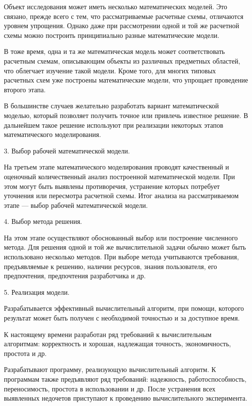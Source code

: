 Объект исследования может иметь несколько математических моделей. Это связано, прежде всего с тем, что рассматриваемые  расчетные схемы, отличаются уровнем упрощения. Однако даже при рассмотрении одной и той же расчетной схемы можно построить принципиально разные математические модели.


В тоже время, одна и та же математическая модель может соответствовать расчетным схемам, описывающим объекты из различных предметных областей, что облегчает изучение такой модели. Кроме того, для многих типовых расчетных схем уже построены математические модели, что упрощает проведение второго этапа.


В большинстве случаев желательно разработать вариант математической моделью, который позволяет получить точное или привлечь известное решение. В дальнейшем такое решение используют при реализации некоторых этапов математического моделирования.


3. Выбор рабочей математической модели.


На третьем этапе математического моделирования проводят качественный и оценочный количественный анализ построенной математической модели. При этом могут быть выявлены противоречия, устранение которых потребует уточнения или пересмотра расчетной схемы. Итог анализа на рассматриваемом этапе — выбор рабочей математической модели.


4. Выбор метода решения.


На этом этапе осуществляют обоснованный выбор или построение численного метода. Для решения одной и той же вычислительной задачи обычно может быть использовано несколько методов.  При выборе метода учитываются требования, предъявляемые к решению,  наличии ресурсов, знания пользователя, его предпочтения, предпочтения разработчика и др.


5. Реализация модели.


Разрабатывается эффективный вычислительный алгоритм, при помощи, которого результат может быть получен с необходимой точностью и за доступное время.


К настоящему времени разработан ряд требований к вычислительным алгоритмам: корректность и хорошая, надлежащая точность, экономичность, простота и др.


Разрабатывают программу, реализующую вычислительный алгоритм. К программам также предъявляют ряд требований: надежность, работоспособность, переносимость, простота в использовании и др.
После устранения всех выявленных недочетов приступают к проведению вычислительного эксперимента.


